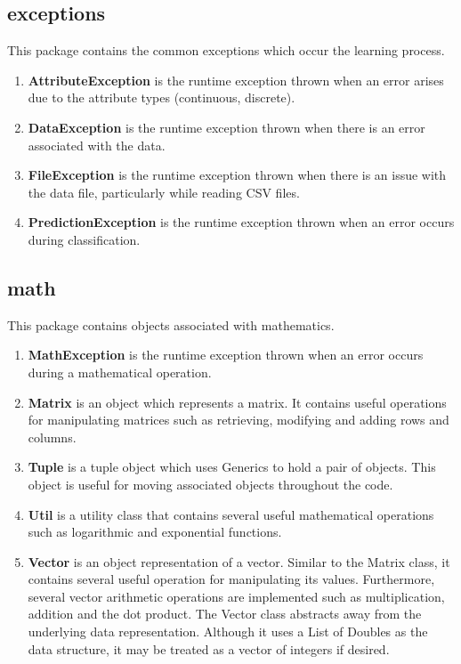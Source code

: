 \documentclass[11pt]{article}
\newcommand{\bb}{\textbf}
\begin{document}
\subsection{exceptions}
This package contains the common exceptions which occur the learning process.

\begin{enumerate}[leftmargin=*]
  \item[] \bb{AttributeException} is the runtime exception thrown when an error arises due to the attribute types (continuous, discrete).
  \item[] \bb{DataException} is the runtime exception thrown when there is an error associated with the data.
  \item[] \bb{FileException} is the runtime exception thrown when there is an issue with the data file, particularly while reading CSV files.
  \item[] \bb{PredictionException} is the runtime exception thrown when an error occurs during classification.
\end{enumerate}

\subsection{math}
This package contains objects associated with mathematics.

\begin{enumerate}[leftmargin=*]
  \item[] \bb{MathException} is the runtime exception thrown when an error occurs during a mathematical operation.
  \item[] \bb{Matrix} is an object which represents a matrix. It contains useful operations for manipulating matrices such as retrieving, modifying and adding rows and columns.
  \item[] \bb{Tuple} is a tuple object which uses Generics to hold a pair of objects. This object is useful for moving associated objects throughout the code.
  \item[] \bb{Util} is a utility class that contains several useful mathematical operations such as logarithmic and exponential functions.
  \item[] \bb{Vector} is an object representation of a vector. Similar to the Matrix class, it contains several useful operation for manipulating its values. Furthermore, several vector arithmetic operations are implemented such as multiplication, addition and the dot product. The Vector class abstracts away from the underlying data representation. Although it uses a List of Doubles as the data structure, it may be treated as a vector of integers if desired.
\end{enumerate}
\end{document}
